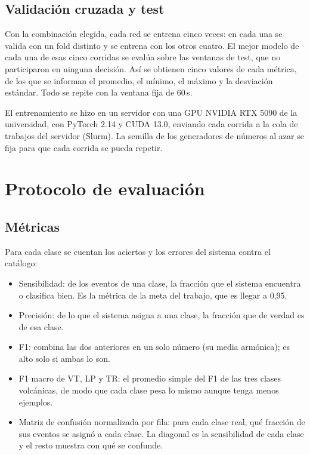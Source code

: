 \subsection{Validación cruzada y test}

Con la combinación elegida, cada red se entrena cinco veces: en cada una se
valida con un fold distinto y se entrena con los otros cuatro. El mejor modelo
de cada una de esas cinco corridas se evalúa sobre las ventanas de test, que
no participaron en ninguna decisión. Así se obtienen cinco valores de cada
métrica, de los que se informan el promedio, el mínimo, el máximo y la
desviación estándar. Todo se repite con la ventana fija de 60\,s.

El entrenamiento se hizo en un servidor con una GPU NVIDIA RTX 5090 de la
universidad, con PyTorch 2.14 y CUDA 13.0, enviando cada corrida a la cola de
trabajos del servidor (Slurm). La semilla de los generadores de números al azar se fija para que
cada corrida se pueda repetir.

\section{Protocolo de evaluación}
\label{sec:protocolo}

\subsection{Métricas}

Para cada clase se cuentan los aciertos y los errores del sistema contra el
catálogo:

\begin{itemize}
\item Sensibilidad: de los eventos de una clase, la fracción que el
  sistema encuentra o clasifica bien. Es la métrica de la meta del trabajo,
  que es llegar a 0,95.
\item Precisión: de lo que el sistema asigna a una clase, la
  fracción que de verdad es de esa clase.
\item F1: combina las dos anteriores en un solo número (su media
  armónica); es alto solo si ambas lo son.
\item F1 macro de VT, LP y TR: el promedio simple del F1 de las tres
  clases volcánicas, de modo que cada clase pesa lo mismo aunque tenga menos
  ejemplos.
\item Matriz de confusión normalizada por fila: para cada clase real,
  qué fracción de sus eventos se asignó a cada clase. La diagonal es la
  sensibilidad de cada clase y el resto muestra con qué se confunde.
\end{itemize}

